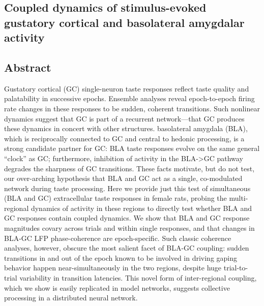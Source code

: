 \begin{refsection}

\chapter[BLA-GC Dynamics]{Coupled dynamics of stimulus-evoked gustatory cortical and basolateral amygdalar activity}

\section{Abstract}
Gustatory cortical (GC) single-neuron taste responses reflect taste quality and palatability in successive epochs. Ensemble analyses reveal epoch-to-epoch firing rate changes in these responses to be sudden, coherent transitions. Such nonlinear dynamics suggest that GC is part of a recurrent network—that GC produces these dynamics in concert with other structures. basolateral amygdala (BLA), which is reciprocally connected to GC and central to hedonic processing, is a strong candidate partner for GC: BLA taste responses evolve on the same general “clock” as GC; furthermore, inhibition of activity in the BLA->GC pathway degrades the sharpness of GC transitions. These facts motivate, but do not test, our over-arching hypothesis that BLA and GC act as a single, co-modulated network during taste processing. Here we provide just this test of simultaneous (BLA and GC) extracellular taste responses in female rats, probing the multi-regional dynamics of activity in these regions to directly test whether BLA and GC responses contain coupled dynamics. We show that BLA and GC response magnitudes covary across trials and within single responses, and that changes in BLA-GC LFP phase-coherence are epoch-specific. Such classic coherence analyses, however, obscure the most salient facet of BLA-GC coupling: sudden transitions in and out of the epoch known to be involved in driving gaping behavior happen near-simultaneously in the two regions, despite huge trial-to-trial variability in transition latencies. This novel form of inter-regional coupling, which we show is easily replicated in model networks, suggests collective processing in a distributed neural network.


\end{refsection}
